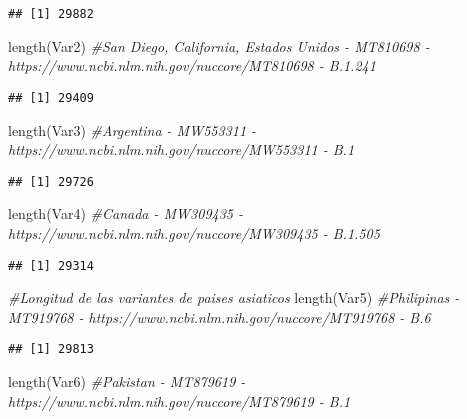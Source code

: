 \documentclass[
]{article}
\newenvironment{Shaded}{\begin{snugshade}}{\end{snugshade}}
\newcommand{\CommentTok}[1]{\textcolor[rgb]{0.56,0.35,0.01}{\textit{#1}}}
\newcommand{\FunctionTok}[1]{\textcolor[rgb]{0.00,0.00,0.00}{#1}}
\newcommand{\NormalTok}[1]{#1}
\begin{document}
\begin{verbatim}
## [1] 29882
\end{verbatim}

\begin{Shaded}
\begin{Highlighting}[]
\FunctionTok{length}\NormalTok{(Var2) }\CommentTok{\#San Diego, California, Estados Unidos {-} MT810698 {-} https://www.ncbi.nlm.nih.gov/nuccore/MT810698 {-} B.1.241}
\end{Highlighting}
\end{Shaded}

\begin{verbatim}
## [1] 29409
\end{verbatim}

\begin{Shaded}
\begin{Highlighting}[]
\FunctionTok{length}\NormalTok{(Var3) }\CommentTok{\#Argentina {-} MW553311 {-} https://www.ncbi.nlm.nih.gov/nuccore/MW553311 {-} B.1}
\end{Highlighting}
\end{Shaded}

\begin{verbatim}
## [1] 29726
\end{verbatim}

\begin{Shaded}
\begin{Highlighting}[]
\FunctionTok{length}\NormalTok{(Var4) }\CommentTok{\#Canada {-} MW309435 {-} https://www.ncbi.nlm.nih.gov/nuccore/MW309435 {-} B.1.505}
\end{Highlighting}
\end{Shaded}

\begin{verbatim}
## [1] 29314
\end{verbatim}

\begin{Shaded}
\begin{Highlighting}[]
\CommentTok{\#Longitud de las variantes de paises asiaticos}
\FunctionTok{length}\NormalTok{(Var5) }\CommentTok{\#Philipinas {-} MT919768 {-} https://www.ncbi.nlm.nih.gov/nuccore/MT919768 {-} B.6}
\end{Highlighting}
\end{Shaded}

\begin{verbatim}
## [1] 29813
\end{verbatim}

\begin{Shaded}
\begin{Highlighting}[]
\FunctionTok{length}\NormalTok{(Var6) }\CommentTok{\#Pakistan {-} MT879619 {-} https://www.ncbi.nlm.nih.gov/nuccore/MT879619 {-} B.1}
\end{Highlighting}
\end{Shaded}
\end{document}
